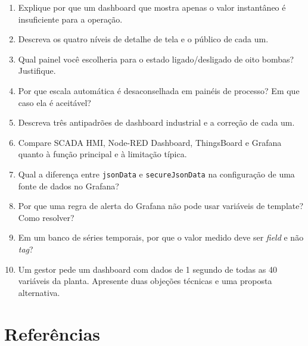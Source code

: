 \begin{enumerate}
\def\labelenumi{\arabic{enumi}.}
\tightlist
\item
  Explique por que um dashboard que mostra apenas o valor instantâneo é insuficiente para a operação.
\item
  Descreva os quatro níveis de detalhe de tela e o público de cada um.
\item
  Qual painel você escolheria para o estado ligado/desligado de oito bombas? Justifique.
\item
  Por que escala automática é desaconselhada em painéis de processo? Em que caso ela é aceitável?
\item
  Descreva três antipadrões de dashboard industrial e a correção de cada um.
\item
  Compare SCADA HMI, Node-RED Dashboard, ThingsBoard e Grafana quanto à função principal e à limitação típica.
\item
  Qual a diferença entre \passthrough{\lstinline!jsonData!} e \passthrough{\lstinline!secureJsonData!} na configuração de uma fonte de dados no Grafana?
\item
  Por que uma regra de alerta do Grafana não pode usar variáveis de template? Como resolver?
\item
  Em um banco de séries temporais, por que o valor medido deve ser \emph{field} e não \emph{tag}?
\item
  Um gestor pede um dashboard com dados de 1 segundo de todas as 40 variáveis da planta. Apresente duas objeções técnicas e uma proposta alternativa.
\end{enumerate}

\section{Referências}\label{referuxeancias}

